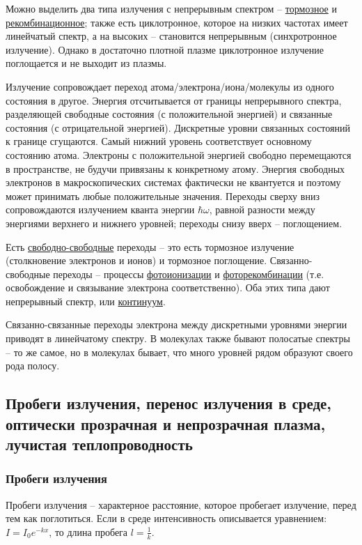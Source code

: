 \documentclass[10pt, a4paper]{article}
\begin{document}
Можно выделить два типа излучения с непрерывным спектром -- \uline{тормозное} и \uline{рекомбинационное}; также есть циклотронное, которое на низких частотах имеет линейчатый спектр, а на высоких -- становится непрерывным (синхротронное излучение). Однако в достаточно плотной плазме циклотронное излучение поглощается и не выходит из плазмы.

Излучение сопровождает переход атома/электрона/иона/молекулы из одного состояния в другое. Энергия отсчитывается от границы непрерывного спектра, разделяющей свободные состояния (с положительной энергией) и связанные состояния (с отрицательной энергией). Дискретные уровни связанных состояний к границе сгущаются. Самый нижний уровень соответствует основному состоянию атома. Электроны с положительной энергией свободно перемещаются в пространстве, не будучи привязаны к конкретному атому. Энергия свободных электронов в макроскопических системах фактически
не квантуется и поэтому может принимать любые положительные
значения. Переходы сверху вниз сопровождаются излучением кванта энергии
$\hbar\omega$, равной разности между энергиями верхнего и нижнего уровней;
переходы снизу вверх -- поглощением.

Есть \uline{свободно-свободные} переходы -- это есть тормозное излучение (столкновение электронов и ионов) и тормозное поглощение. Связанно-свободные переходы -- процессы \uline{фотоионизации} и \uline{фоторекомбинации} (т.е. освобождение и связывание электрона соответственно). Оба этих типа дают непрерывный спектр, или \uline{континуум}.

Связанно-связанные переходы электрона между дискретными уровнями энергии приводят в линейчатому спектру. В молекулах также
бывают полосатые спектры -- то же самое, но в молекулах бывает, что много уровней рядом образуют своего рода полосу.

\subsection{Пробеги излучения, перенос излучения в среде, оптически прозрачная и непрозрачная плазма, лучистая теплопроводность}

\subsubsection{Пробеги излучения}

Пробеги излучения -- характерное расстояние, которое пробегает излучение, перед тем как поглотиться. Если в среде интенсивность описывается уравнением: $I=I_0e^{-kx}$, то длина пробега $l=\frac{1}{k}$.
\end{document}
